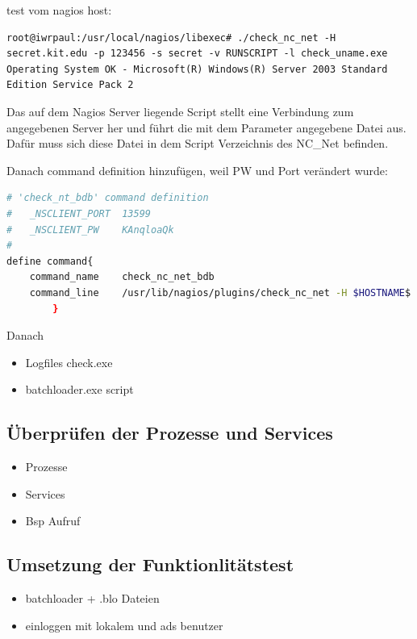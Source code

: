 test vom nagios host:

\begin{lstlisting}[captionpos=b, caption=Aufruf eines aktiven Checks, label=activecheckexample, breaklines = true]
root@iwrpaul:/usr/local/nagios/libexec# ./check_nc_net -H secret.kit.edu -p 123456 -s secret -v RUNSCRIPT -l check_uname.exe
Operating System OK - Microsoft(R) Windows(R) Server 2003 Standard Edition Service Pack 2
\end{lstlisting}

Das auf dem Nagios Server liegende Script  stellt eine Verbindung zum angegebenen Server her und führt die mit dem Parameter  angegebene Datei aus. Dafür muss sich diese Datei in dem Script Verzeichnis des NC\_Net befinden.


Danach command definition hinzufügen, weil PW und Port verändert wurde:
\begin{lstlisting}[captionpos=b, caption=Nagios-Befehls Definition für den Host, label=cmddefbdb, breaklines = true, language=sh]
# 'check_nt_bdb' command definition
#	_NSCLIENT_PORT	13599
#	_NSCLIENT_PW	KAnqloaQk
#
define command{
    command_name    check_nc_net_bdb
	command_line 	/usr/lib/nagios/plugins/check_nc_net -H $HOSTNAME$ -p 13599 -s KAnqloaQk -v $ARG1$
        }
\end{lstlisting}

Danach
\begin{itemize}
\item Logfiles check.exe 
\item batchloader.exe script
\end{itemize}


\subsection{Überprüfen der Prozesse und Services}
\begin{itemize}
\item Prozesse
\item Services
\item Bsp Aufruf
\end{itemize}

\subsection{Umsetzung der Funktionlitätstest}
\begin{itemize}
\item batchloader + .blo Dateien
\item einloggen mit lokalem und ads benutzer
\end{itemize}




